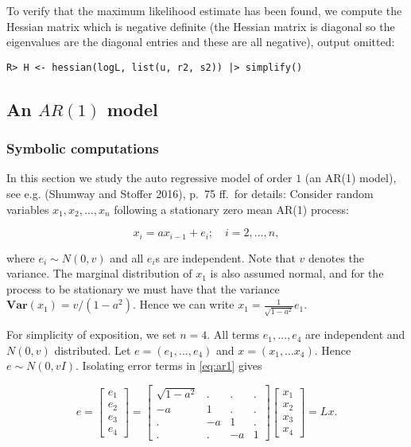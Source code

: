 To verify that the maximum likelihood estimate has been found, we compute the Hessian matrix
which is negative definite (the Hessian matrix is diagonal so the eigenvalues are the diagonal entries and these are all negative), output omitted:

\begin{verbatim}
R> H <- hessian(logL, list(u, r2, s2)) |> simplify()
\end{verbatim}

\hypertarget{an-ar1-model}{%
\subsection{\texorpdfstring{An \(AR(1)\) model}{An AR(1) model}}\label{an-ar1-model}}

\hypertarget{symbolic-computations}{%
\subsubsection{Symbolic computations}\label{symbolic-computations}}

In this section we study the auto regressive model of order \(1\) (an AR(1) model), see
e.g. (Shumway and Stoﬀer 2016), p.~75 ff.~for details:
Consider random variables \(x_1, x_2, \dots, x_n\) following a stationary zero mean AR(1) process:

\begin{equation}
  x_i = a x_{i-1} + e_i; \quad i=2, \dots, n,
  \label{eq:ar1}
\end{equation}

where \(e_i \sim N(0, v)\) and all \(e_i\)s are independent. Note that \(v\) denotes the variance.
The marginal distribution of \(x_1\) is also assumed normal, and for the process to be stationary
we must have that the variance \(\mathbf{Var}(x_1) = v / (1-a^2)\).
Hence we can write \(x_1 = \frac 1 {\sqrt{1-a^2}} e_1\).

For simplicity of exposition, we set \(n=4\). All terms \(e_1, \dots, e_4\) are independent and \(N(0, v)\) distributed. Let \(e=(e_1, \dots, e_4)\) and \(x=(x_1, \dots x_4)\). Hence \(e \sim N(0, v I)\). Isolating
error terms in \eqref{eq:ar1} gives

\[
  e= \left[\begin{matrix}e_{1}\\e_{2}\\e_{3}\\e_{4}\end{matrix}\right] = \left[\begin{matrix}\sqrt{1 - a^{2}} & . & . & .\\- a & 1 & . & .\\. & - a & 1 & .\\. & . & - a & 1\end{matrix}\right] \left[\begin{matrix}x_{1}\\x_{2}\\x_{3}\\x_{4}\end{matrix}\right] = L x  .
\]

